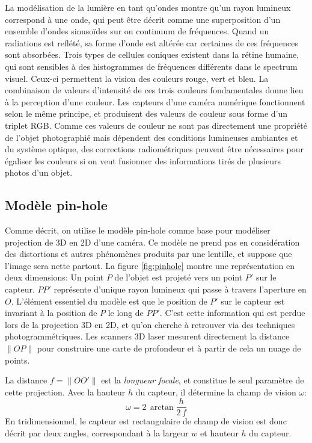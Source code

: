 \documentclass[a4paper,10pt]{scrreprt}
\begin{document}
La modélisation de la lumière en tant qu'ondes montre qu'un rayon lumineux correspond à une onde, qui peut être décrit comme une superposition d'un ensemble d'ondes sinusoïdes sur on continuum de fréquences. Quand un radiations est reflété, sa forme d'onde est altérée car certaines de ces fréquences sont absorbées. Trois types de cellules coniques existent dans la rétine humaine, qui sont sensibles à des histogrammes de fréquences différents dans le spectrum visuel. Ceux-ci permettent la vision des couleurs rouge, vert et bleu. La combinaison de valeurs d'intensité de ces trois couleurs fondamentales donne lieu à la perception d'une couleur. Les capteurs d'une caméra numérique fonctionnent selon le même principe, et produisent des valeurs de couleur sous forme d'un triplet RGB. Comme ces valeurs de couleur ne sont pas directement une propriété de l'objet photographié mais dépendent des conditions lumineuses ambiantes et du système optique, des corrections radiométriques peuvent être nécessaires pour égaliser les couleurs si on veut fusionner des informations tirés de plusieurs photos d'un objet.


\subsection{Modèle pin-hole}
Comme décrit, on utilise le modèle pin-hole comme base pour modéliser projection de 3D en 2D d'une caméra. Ce modèle ne prend pas en considération des distortions et autres phénomènes produits par une lentille, et suppose que l'image sera nette partout. La figure \ref{fig:pinhole} montre une représentation en deux dimensions: Un point $P$ de l'objet est projeté vers un point $P'$ sur le capteur. $P P'$ représente d'unique rayon lumineux qui passe à travers l'aperture en $O$. L'élément essentiel du modèle est que le position de $P'$ sur le capteur est invariant à la position de $P$ le long de $P P'$. C'est cette information qui est perdue lors de la projection 3D en 2D, et qu'on cherche à retrouver via des techniques photogrammétriques. Les scanners 3D laser mesurent directement la distance $\|O P\|$ pour construire une carte de profondeur et à partir de cela un nuage de points.

La distance $f = \|O O'\|$ est la \emph{longueur focale}, et constitue le seul paramètre de cette projection. Avec la hauteur $h$ du capteur, il détermine la champ de vision $\omega$:
\begin{equation}
	\omega = 2 \, \arctan \frac{h}{2 \, f}
\end{equation}
En tridimensionnel, le capteur est rectangulaire de champ de vision est donc décrit par deux angles, correspondant à la largeur $w$ et hauteur $h$ du capteur.
\end{document}
